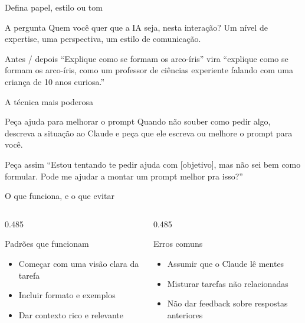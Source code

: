 \documentclass[aspectratio=169,11pt]{beamer}
\begin{document}
\begin{frame}{Defina papel, estilo ou tom}
  \begin{notebox}{A pergunta}
    \small Quem você quer que a IA seja, nesta interação? Um nível de expertise, uma perspectiva, um estilo de comunicação.
  \end{notebox}
  \vspace{0.3cm}
  \begin{alertbox}{Antes / depois}
    \small ``Explique como se formam os arco-íris'' vira ``explique como se formam os arco-íris, como um professor de ciências experiente falando com uma criança de 10 anos curiosa.''
  \end{alertbox}
\end{frame}

\begin{frame}{A técnica mais poderosa}
  \begin{notebox}{Peça ajuda para melhorar o prompt}
    \small Quando não souber como pedir algo, descreva a situação ao Claude e peça que ele escreva ou melhore o prompt para você.
  \end{notebox}
  \vspace{0.3cm}
  \begin{alertbox}{Peça assim}
    \small ``Estou tentando te pedir ajuda com [objetivo], mas não sei bem como formular. Pode me ajudar a montar um prompt melhor pra isso?''
  \end{alertbox}
\end{frame}

\begin{frame}{O que funciona, e o que evitar}
  \begin{columns}[T,onlytextwidth]
    \begin{column}{0.485\textwidth}
      \begin{notebox}{Padrões que funcionam}
        \small
        \begin{itemize}
          \item Começar com uma visão clara da tarefa
          \item Incluir formato e exemplos
          \item Dar contexto rico e relevante
        \end{itemize}
      \end{notebox}
    \end{column}
    \begin{column}{0.485\textwidth}
      \begin{alertbox}{Erros comuns}
        \small
        \begin{itemize}
          \item Assumir que o Claude lê mentes
          \item Misturar tarefas não relacionadas
          \item Não dar feedback sobre respostas anteriores
        \end{itemize}
      \end{alertbox}
    \end{column}
  \end{columns}
\end{frame}
\end{document}
